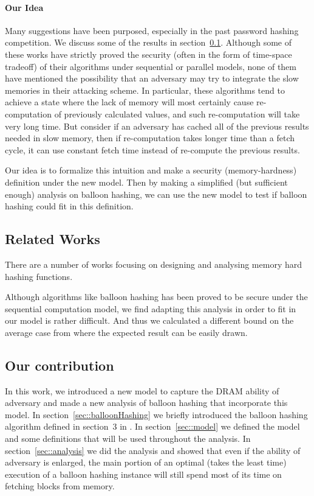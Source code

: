 \documentclass[a4paper]{article}
\begin{document}
\paragraph{Our Idea}
Many suggestions have been purposed, especially in the past password hashing competition. %
We discuss some of the results in section~\ref{subsec::relatedWorks}. Although some of these works have strictly proved
the security (often in the form of time-space tradeoff) of their algorithms under sequential or parallel models, none of
them have mentioned the possibility that
an adversary may try to integrate the slow memories in their attacking scheme. In particular, these algorithms tend to
achieve a state where the lack of memory will most certainly cause re-computation of previously calculated values, and
such re-computation will take very long time. But consider if an adversary has cached all of the previous results needed
in slow memory, then if re-computation takes longer time than a fetch cycle, it can use constant fetch time instead of
re-compute the previous results.

Our idea is to formalize this intuition and make a security (memory-hardness) definition under the new model. Then by
making a simplified (but sufficient enough) analysis on balloon hashing, we can use the new model to test if balloon
hashing could fit in this definition.


\subsection{Related Works}\label{subsec::relatedWorks}
There are a number of works focusing on designing and analysing memory hard hashing functions.

Although algorithms like balloon hashing has been proved to be secure under the sequential computation model, we find
adapting this analysis in order to fit in our model is rather difficult. And thus we calculated a different bound on
the average case from where the expected result can be easily drawn.

\subsection{Our contribution}
In this work, we introduced a new model to capture the DRAM ability of adversary and made a new analysis of
balloon hashing that incorporate this model. In section~\ref{sec::balloonHashing} we briefly introduced the
balloon hashing algorithm defined in section~3 in \cite{corrigan2016balloon}.
In section~\ref{sec::model} we defined the model and some definitions
that will be used throughout the analysis. In section~\ref{sec::analysis} we did the analysis and showed that even
if the ability of adversary is enlarged, the main portion of an optimal (takes the least time) execution of
a balloon hashing instance will still spend most of its time on fetching blocks from memory.
\end{document}
